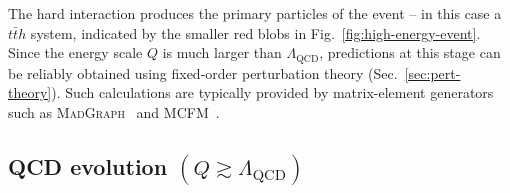 The hard interaction produces the primary particles of the event -- in this case a $t\bar{t}h$ system, indicated by the smaller red blobs in Fig.~\ref{fig:high-energy-event}. Since the energy scale $Q$ is much larger than $\Lambda_{\mathrm{QCD}}$, predictions at this stage can be reliably obtained using fixed-order perturbation theory (Sec.~\ref{sec:pert-theory}). Such calculations are typically provided by matrix-element generators such as \textsc{MadGraph}~\cite{Alwall:2014hca} and \textsc{MCFM}~\cite{Campbell:1999ah,Campbell:2011bn,Campbell:2019dru}.

\subsection{QCD evolution $(Q \gtrsim \Lambda_{\mathrm{QCD}})$}
\label{subsec:QCD-ev}

